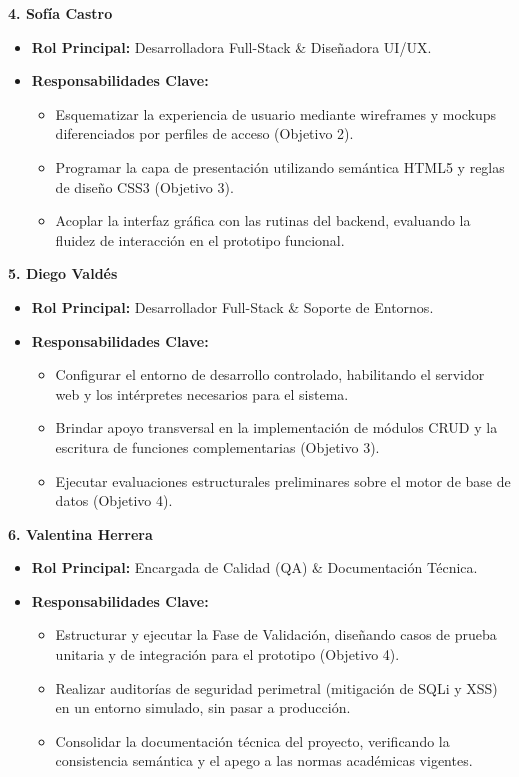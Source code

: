\noindent \textbf{4. Sofía Castro}
\begin{itemize}
	\item \textbf{Rol Principal:} Desarrolladora Full-Stack \& Diseñadora UI/UX.
	\item \textbf{Responsabilidades Clave:}
	\begin{itemize}
		\item Esquematizar la experiencia de usuario mediante wireframes y mockups diferenciados por perfiles de acceso (Objetivo 2).
		\item Programar la capa de presentación utilizando semántica HTML5 y reglas de diseño CSS3 (Objetivo 3).
		\item Acoplar la interfaz gráfica con las rutinas del backend, evaluando la fluidez de interacción en el prototipo funcional.
	\end{itemize}
\end{itemize}
\vspace{0.5em}

\noindent \textbf{5. Diego Valdés}
\begin{itemize}
	\item \textbf{Rol Principal:} Desarrollador Full-Stack \& Soporte de Entornos.
	\item \textbf{Responsabilidades Clave:}
	\begin{itemize}
		\item Configurar el entorno de desarrollo controlado, habilitando el servidor web y los intérpretes necesarios para el sistema.
		\item Brindar apoyo transversal en la implementación de módulos CRUD y la escritura de funciones complementarias (Objetivo 3).
		\item Ejecutar evaluaciones estructurales preliminares sobre el motor de base de datos (Objetivo 4).
	\end{itemize}
\end{itemize}
\vspace{0.5em}

\noindent \textbf{6. Valentina Herrera}
\begin{itemize}
	\item \textbf{Rol Principal:} Encargada de Calidad (QA) \& Documentación Técnica.
	\item \textbf{Responsabilidades Clave:}
	\begin{itemize}
		\item Estructurar y ejecutar la Fase de Validación, diseñando casos de prueba unitaria y de integración para el prototipo (Objetivo 4).
		\item Realizar auditorías de seguridad perimetral (mitigación de SQLi y XSS) en un entorno simulado, sin pasar a producción.
		\item Consolidar la documentación técnica del proyecto, verificando la consistencia semántica y el apego a las normas académicas vigentes.
	\end{itemize}
\end{itemize}

